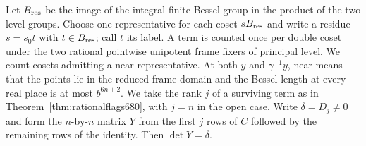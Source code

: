 \documentclass[a4paper,11pt]{article}
\theoremstyle{definition}
\theoremstyle{remark}
\numberwithin{equation}{section}
\begin{document}
Let \(B_{\rm res}\) be the image of the integral finite
Bessel group in the product of the two level groups. Choose one
representative for each coset \(s B_{\rm res}\) and write a
residue \(s=s_0t\) with \(t\in B_{\rm res}\); call \(t\) its
label. A term is counted once per double coset under the two
rational pointwise unipotent frame fixers of principal level.
We count cosets admitting a near representative. At both
\(y\) and \(\gamma^{-1}y\), near means that the points lie in
the reduced frame domain and the Bessel length at every real
place is at most \(b^{6n+2}\). We take the rank \(j\) of a
surviving term as in Theorem~\ref{thm:rationalflags680}, with
\(j=n\) in the open case. Write \(\delta=D_j\ne0\) and form
the \(n\)-by-\(n\) matrix \(Y\) from the first \(j\) rows of
\(C\) followed by the remaining rows of the identity. Then
\(\det Y=\delta\).
\end{document}

